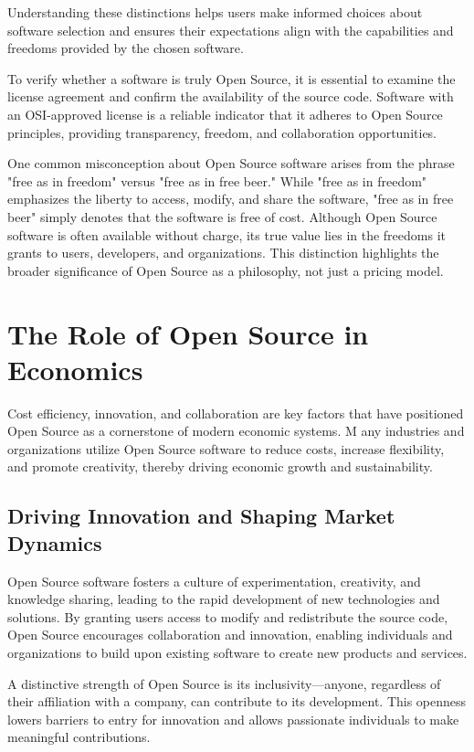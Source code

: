 Understanding these distinctions helps users make informed choices about software selection and ensures their expectations align with the capabilities and freedoms provided by the chosen software.

To verify whether a software is truly Open Source, it is essential to examine the license agreement and confirm the availability of the source code. 
Software with an OSI-approved license is a reliable indicator that it adheres to Open Source principles, providing transparency, freedom, and collaboration opportunities.

One common misconception about Open Source software arises from the phrase "free as in freedom" versus "free as in free beer."  
While "free as in freedom" emphasizes the liberty to access, modify, and share the software, "free as in free beer" simply denotes that the software is free of cost. 
Although Open Source software is often available without charge, its true value lies in the freedoms it grants to users, developers, and organizations. 
This distinction highlights the broader significance of Open Source as a philosophy, not just a pricing model.

\cite{forbes_misconceptions_open_source_2024}


\section{The Role of Open Source in Economics}

Cost efficiency, innovation, and collaboration are key factors that have positioned Open Source as a cornerstone of modern economic systems. M
any industries and organizations utilize Open Source software to reduce costs, increase flexibility, 
and promote creativity, thereby driving economic growth and sustainability.

\subsection{Driving Innovation and Shaping Market Dynamics}

Open Source software fosters a culture of experimentation, creativity, and knowledge sharing, 
leading to the rapid development of new technologies and solutions. By granting users access to modify and redistribute the source code, 
Open Source encourages collaboration and innovation, 
enabling individuals and organizations to build upon existing software to create new products and services.

A distinctive strength of Open Source is its inclusivity—anyone, regardless of their affiliation with a company,
can contribute to its development. 
This openness lowers barriers to entry for innovation and allows passionate individuals to make meaningful contributions.

